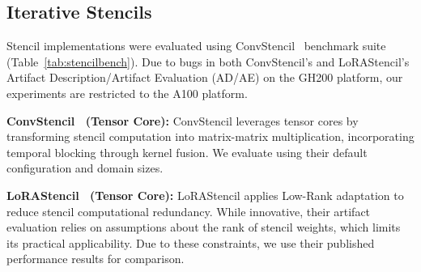 




\subsection{Iterative Stencils}

Stencil implementations were evaluated using ConvStencil~\cite{10.1145/3627535.3638476} benchmark suite (Table~\ref{tab:stencilbench}). %
Due to bugs in both ConvStencil's and LoRAStencil's Artifact Description/Artifact Evaluation (AD/AE) on the GH200 platform, our experiments are restricted to the A100 platform.

\noindent\textbf{ConvStencil~\cite{10.1145/3627535.3638476} (Tensor Core):}
ConvStencil leverages tensor cores by transforming stencil computation into matrix-matrix multiplication, incorporating temporal blocking through kernel fusion. We evaluate using their default configuration and domain sizes.

\noindent\textbf{LoRAStencil~\cite{lorastencil} (Tensor Core):} LoRAStencil applies Low-Rank adaptation to reduce stencil computational redundancy. While innovative, their artifact evaluation relies on assumptions about the rank of stencil weights, which limits its practical applicability. Due to these constraints, we use their published performance results for comparison.
% 

